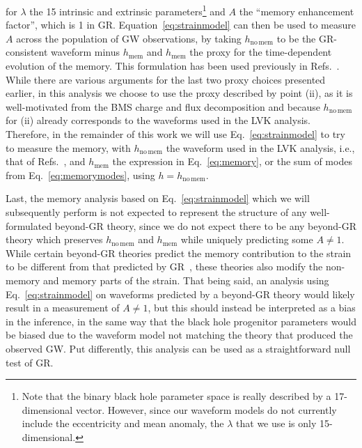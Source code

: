 \documentclass[aps,prd,reprint,twocolumn,10pt,eqsecnum,showpacs,nofootinbib,amsfonts,amssymb,amsmath,longbibliography,superscriptaddress,floatfix]{revtex4-1}
\begin{document}
for $\lambda$ the 15 intrinsic and extrinsic parameters\footnote{Note that the binary black hole parameter space is really described by a 17-dimensional vector. However, since our waveform models do not currently include the eccentricity and mean anomaly, the $\lambda$ that we use is only 15-dimensional.} and $A$ the ``memory enhancement factor'', which is 1 in GR. Equation~\eqref{eq:strainmodel} can then be used to measure $A$ across the population of GW observations, by taking $h_{\mathrm{no\,mem}}$ to be the GR-consistent waveform minus $h_{\mathrm{mem}}$ and $h_{\mathrm{mem}}$ the proxy for the time-dependent evolution of the memory. This formulation has been used previously in Refs.~\cite{Scargle:2021lqz,Cheung:2024zow}. While there are various arguments for the last two proxy choices presented earlier, in this analysis we choose to use the proxy described by point (ii), as it is well-motivated from the BMS charge and flux decomposition and because $h_{\mathrm{no\,mem}}$ for (ii) already corresponds to the waveforms used in the LVK analysis. Therefore, in the remainder of this work we will use Eq.~\eqref{eq:strainmodel} to try to measure the memory, with $h_{\mathrm{no\,mem}}$ the waveform used in the LVK analysis, i.e., that of Refs.~\cite{Varma:2019csw,Pratten:2020ceb,Colleoni:2024knd,Pompili:2023tna,Ramos-Buades:2023ehm,Hamilton:2021pkf,Thompson:2023ase}, and $h_{\mathrm{mem}}$ the expression in Eq.~\eqref{eq:memory}, or the sum of modes from Eq.~\eqref{eq:memorymodes}, using $h=h_{\mathrm{no\,mem}}$.

Last, the memory analysis based on Eq.~\eqref{eq:strainmodel} which we will subsequently perform is not expected to represent the structure of any well-formulated beyond-GR theory, since we do not expect there to be any beyond-GR theory which preserves $h_{\mathrm{no\,mem}}$ and $h_{\mathrm{mem}}$ while uniquely predicting some $A\not=1$. While certain beyond-GR theories predict the memory contribution to the strain to be different from that predicted by GR~\cite{Lang:2013fna,Du:2016hww,Koyama:2020vfc,Tahura:2021hbk,Bernard:2022noq,Heisenberg:2023prj,Tahura:2025ebb,Heisenberg:2025roe,Heisenberg:2025tfh,Gasparotto:2026bru,Zosso:2026uty}, these theories also modify the non-memory and memory parts of the strain. That being said, an analysis using Eq.~\eqref{eq:strainmodel} on waveforms predicted by a beyond-GR theory would likely result in a measurement of $A\not=1$, but this should instead be interpreted as a bias in the inference, in the same way that the black hole progenitor parameters would be biased due to the waveform model not matching the theory that produced the observed GW. Put differently, this analysis can be used as a straightforward null test of GR.
\end{document}

